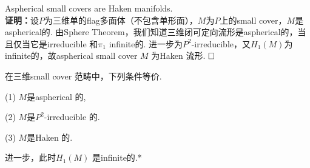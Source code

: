 \documentclass{article}
\theoremstyle{plain}%
\theoremstyle{definition}
\theoremstyle{remark}
\begin{document}
{{\cor  Aspherical small covers are Haken manifolds.
}\\
{\bf 证明：}设$P$为三维单的flag多面体（不包含单形面），$M$为$P$上的small cover，$M$是aspherical的. 由Sphere Theorem，我们知道三维闭可定向流形是aspherical的，当且仅当它是irreducible 和$\pi_1$ infinite的. 进一步为$P^2$-irreducible，又$H_1(M)$为infinite的，故aspherical small cover $M$ 为Haken 流形. $\hfill{} \Box$

{\thm 在三维small cover 范畴中，下列条件等价.
\item[(1)]  $M$是aspherical 的,
\item[(2)]  $M$是$P^2$-irreducible 的.
\item[(3)]  $M$是Haken 的.

进一步，此时$H_1(M)$ 是infinite的.*
}


}
\end{document}
